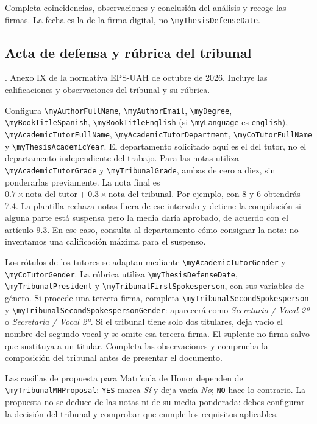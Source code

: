 \documentclass[10pt,a4paper]{article}
\newcommand{\variable}[1]{\texttt{\textbackslash{}}\nolinkurl{#1}}
\newcommand{\fichero}[1]{\path{#1}}
\begin{document}
Completa coincidencias, observaciones y conclusión del análisis y recoge las firmas. La fecha es la de la firma digital, no \variable{myThesisDefenseDate}.

\subsection{Acta de defensa y rúbrica del tribunal}\label{form:acta}

\fichero{TFG-AnexoIX-ActaYRubricaDefensa-EPS-UAH.tex}. Anexo IX de la normativa EPS-UAH de octubre de 2026. Incluye las calificaciones y observaciones del tribunal y su rúbrica.

Configura \variable{myAuthorFullName}, \variable{myAuthorEmail}, \variable{myDegree}, \variable{myBookTitleSpanish}, \variable{myBookTitleEnglish} (si \variable{myLanguage} es \texttt{english}), \variable{myAcademicTutorFullName}, \variable{myAcademicTutorDepartment}, \variable{myCoTutorFullName} y \variable{myThesisAcademicYear}. El departamento solicitado aquí es el del tutor, no el departamento independiente del trabajo. Para las notas utiliza \variable{myAcademicTutorGrade} y \variable{myTribunalGrade}, ambas de cero a diez, sin ponderarlas previamente. La nota final es \(0.7 \times \mbox{nota del tutor} + 0.3 \times \mbox{nota del tribunal}\). Por ejemplo, con 8 y 6 obtendrás 7.4. La plantilla rechaza notas fuera de ese intervalo y detiene la compilación si alguna parte está suspensa pero la media daría aprobado, de acuerdo con el artículo 9.3. En ese caso, consulta al departamento cómo consignar la nota: no inventamos una calificación máxima para el suspenso.

Los rótulos de los tutores se adaptan mediante \variable{myAcademicTutorGender} y \variable{myCoTutorGender}. La rúbrica utiliza \variable{myThesisDefenseDate}, \variable{myTribunalPresident} y \variable{myTribunalFirstSpokesperson}, con sus variables de género. Si procede una tercera firma, completa \variable{myTribunalSecondSpokesperson} y \variable{myTribunalSecondSpokespersonGender}: aparecerá como \emph{Secretario / Vocal 2º} o \emph{Secretaria / Vocal 2ª}. Si el tribunal tiene solo dos titulares, deja vacío el nombre del segundo vocal y se omite esa tercera firma. El suplente no firma salvo que sustituya a un titular. Completa las observaciones y comprueba la composición del tribunal antes de presentar el documento.

Las casillas de propuesta para Matrícula de Honor dependen de \variable{myTribunalMHProposal}: \texttt{YES} marca \emph{Sí} y deja vacía \emph{No}; \texttt{NO} hace lo contrario. La propuesta no se deduce de las notas ni de su media ponderada: debes configurar la decisión del tribunal y comprobar que cumple los requisitos aplicables.
\end{document}
